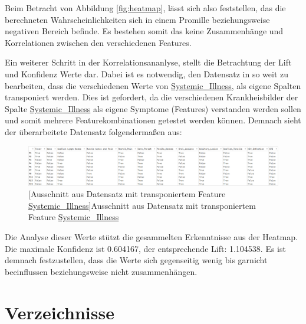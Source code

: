 \documentclass[13pt,a4paper, listof=entryprefix, bibliography=totocnumbered,toc=listofnumbered,lof=listofnumbered]{scrartcl}
\newcounter{verzeichnis}
\begin{document}
	Beim Betracht von Abbildung \ref{fig:heatmap}, lässt sich also feststellen, das die berechneten Wahrscheinlichkeiten sich in einem Promille beziehungsweise 
	negativen Bereich befinde. Es bestehen somit das keine Zusammenhänge und Korrelationen zwischen den verschiedenen Features. 

	Ein weiterer Schritt in der Korrelationsananlyse, stellt die Betrachtung der Lift und Konfidenz Werte dar. Dabei ist es notwendig, den 
	Datensatz in so weit zu bearbeiten, dass die verschiedenen Werte von \url{Systemic_Illness}, als eigene Spalten transponiert werden. 
	Dies ist gefordert, da die verschiedenen Krankheisbilder der Spalte \url{Systemic_Illness} als eigene Symptome (Features) verstanden werden sollen und somit mehrere Featurekombinationen 
	getestet werden können. Demnach sieht der überarbeitete Datensatz folgendermaßen aus: 

	\begin{figure}[H]
		\centering
		\includegraphics[width=0.8\linewidth]{Bilder/tranp_df.png}
		[Ausschnitt aus Datensatz mit transponiertem Feature \url{Systemic_Illness}]{Ausschnitt aus Datensatz mit transponiertem Feature \url{Systemic_Illness}}
		\label{fig:transp_feature}
	\end{figure}

	Die Analyse dieser Werte stützt die gesammelten Erkenntnisse aus der Heatmap. Die maximale Konfidenz ist 0.604167, der entsprechende Lift:
	1.104538. Es ist demnach festzustellen, dass die Werte sich gegenseitig wenig bis garnicht beeinflussen beziehungsweise nicht zusammenhängen. 


		\pagebreak

		 \label{Verzeichnisse}
		\renewcommand{\thesection}{\Roman{verzeichnis}}
		\section*{Verzeichnisse}
   		 \label{Literaturverzeichnis}
		\renewcommand{\refname}{Literaturverzeichnis}
		\printbibliography
		\pagebreak
\end{document}
